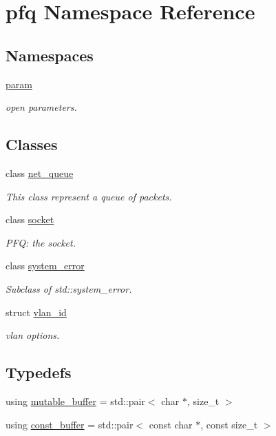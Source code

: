 \hypertarget{namespacepfq}{}\section{pfq Namespace Reference}
\label{namespacepfq}
\subsection*{Namespaces}
\begin{DoxyCompactItemize}
\item 
 \hyperlink{namespacepfq_1_1param}{param}
\begin{DoxyCompactList}\small\item\em open parameters. \end{DoxyCompactList}\end{DoxyCompactItemize}
\subsection*{Classes}
\begin{DoxyCompactItemize}
\item 
class \hyperlink{classpfq_1_1net__queue}{net\+\_\+queue}
\begin{DoxyCompactList}\small\item\em This class represent a queue of packets. \end{DoxyCompactList}\item 
class \hyperlink{classpfq_1_1socket}{socket}
\begin{DoxyCompactList}\small\item\em P\+FQ\+: the socket. \end{DoxyCompactList}\item 
class \hyperlink{classpfq_1_1system__error}{system\+\_\+error}
\begin{DoxyCompactList}\small\item\em Subclass of std\+::system\+\_\+error. \end{DoxyCompactList}\item 
struct \hyperlink{structpfq_1_1vlan__id}{vlan\+\_\+id}
\begin{DoxyCompactList}\small\item\em vlan options. \end{DoxyCompactList}\end{DoxyCompactItemize}
\subsection*{Typedefs}
\begin{DoxyCompactItemize}
\item 
using \hyperlink{namespacepfq_ad7b88920eaf729154354741132483ea8}{mutable\+\_\+buffer} = std\+::pair$<$ char $\ast$, size\+\_\+t $>$
\item 
using \hyperlink{namespacepfq_ac835a1bd09b4cbaba61c100b50d0a99f}{const\+\_\+buffer} = std\+::pair$<$ const char $\ast$, const size\+\_\+t $>$
\end{DoxyCompactItemize}
